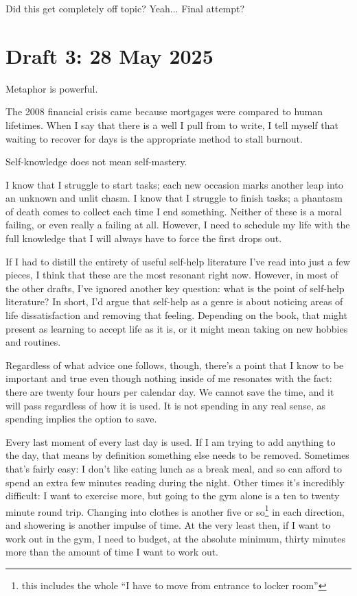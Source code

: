\documentclass[12pt]{article}
\newcommand{\say}[1]{``#1''}
\renewcommand{\,}{\textsuperscript{,}}
\begin{document}
Did this get completely off topic?  
Yeah...  
Final attempt?

\section{Draft 3: 28 May 2025}

Metaphor is powerful.

The 2008 financial crisis came because mortgages were compared to human lifetimes.  
When I say that there is a well I pull from to write, I tell myself that waiting to recover for days is the appropriate method to stall burnout.

Self-knowledge does not mean self-mastery.

I know that I struggle to start tasks; each new occasion marks another leap into an unknown and unlit chasm.  
I know that I struggle to finish tasks; a phantasm of death comes to collect each time I end something.  
Neither of these is a moral failing, or even really a failing at all.  
However, I need to schedule my life with the full knowledge that I will always have to force the first drops out.

If I had to distill the entirety of useful self-help literature I've read into just a few pieces, I think that these are the most resonant right now.  
However, in most of the other drafts, I've ignored another key question: what is the point of self-help literature?  
In short, I'd argue that self-help as a genre is about noticing areas of life dissatisfaction and removing that feeling.  
Depending on the book, that might present as learning to accept life as it is, or it might mean taking on new hobbies and routines.

Regardless of what advice one follows, though, there's a point that I know to be important and true even though nothing inside of me resonates with the fact: there are twenty four hours per calendar day.  
We cannot save the time, and it will pass regardless of how it is used.  
It is not spending in any real sense, as spending implies the option to save.

Every last moment of every last day is used.  
If I am trying to add anything to the day, that means by definition something else needs to be removed.  
Sometimes that's fairly easy: I don't like eating lunch as a break meal, and so can afford to spend an extra few minutes reading during the night.  
Other times it's incredibly difficult: I want to exercise more, but going to the gym alone is a ten to twenty minute round trip.  
Changing into clothes is another five or so\footnote{this includes the whole \say{I have to move from entrance to locker room}} in each direction, and showering is another impulse of time.  
At the very least then, if I want to work out in the gym, I need to budget, at the absolute minimum, thirty minutes more than the amount of time I want to work out.
\end{document}
